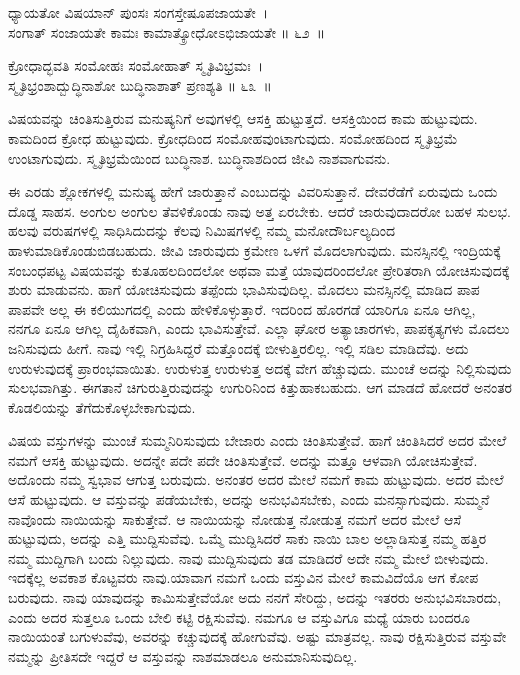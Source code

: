\begin{shloka}
ಧ್ಯಾಯತೋ ವಿಷಯಾನ್ ಪುಂಸಃ ಸಂಗಸ್ತೇಷೂಪಜಾಯತೇ~।\\ಸಂಗಾತ್ ಸಂಜಾಯತೇ ಕಾಮಃ ಕಾಮಾತ್\hfill\break ಕ್ರೋಧೋಽಭಿಜಾಯತೇ \hfill॥ ೬೨~॥
\end{shloka}

\begin{shloka}
ಕ್ರೋಧಾದ್ಭವತಿ ಸಂಮೋಹಃ ಸಂಮೋಹಾತ್ ಸ್ಮೃತಿವಿಭ್ರಮಃ~।\\ಸ್ಮೃತಿಭ್ರಂಶಾದ್ಬುದ್ಧಿನಾಶೋ ಬುದ್ಧಿನಾಶಾತ್ ಪ್ರಣಶ್ಯತಿ \hfill॥ ೬೩~॥
\end{shloka}

\begin{artha}
ವಿಷಯವನ್ನು ಚಿಂತಿಸುತ್ತಿರುವ ಮನುಷ್ಯನಿಗೆ ಅವುಗಳಲ್ಲಿ ಆಸಕ್ತಿ ಹುಟ್ಟುತ್ತದೆ. ಆಸಕ್ತಿಯಿಂದ ಕಾಮ ಹುಟ್ಟುವುದು. ಕಾಮದಿಂದ ಕ್ರೋಧ ಹುಟ್ಟುವುದು. ಕ್ರೋಧದಿಂದ ಸಂಮೋಹವುಂಟಾಗುವುದು. ಸಂಮೋಹದಿಂದ ಸ್ಮೃತಿಭ್ರಮೆ ಉಂಟಾಗುವುದು. ಸ್ಮೃತಿಭ್ರಮೆಯಿಂದ ಬುದ್ಧಿನಾಶ. ಬುದ್ಧಿನಾಶದಿಂದ ಜೀವಿ ನಾಶವಾಗುವನು.
\end{artha}

ಈ ಎರಡು ಶ್ಲೋಕಗಳಲ್ಲಿ ಮನುಷ್ಯ ಹೇಗೆ ಜಾರುತ್ತಾನೆ ಎಂಬುದನ್ನು ವಿವರಿಸುತ್ತಾನೆ. ದೇವರೆಡೆಗೆ ಏರುವುದು ಒಂದು ದೊಡ್ಡ ಸಾಹಸ. ಅಂಗುಲ ಅಂಗುಲ ತೆವಳಿಕೊಂಡು ನಾವು ಅತ್ತ ಏರಬೇಕು. ಆದರೆ ಜಾರುವುದಾದರೋ ಬಹಳ ಸುಲಭ. ಹಲವು ವರುಷಗಳಲ್ಲಿ ಸಾಧಿಸಿದುದನ್ನು ಕೆಲವು ನಿಮಿಷಗಳಲ್ಲಿ ನಮ್ಮ ಮನೋದೌರ್ಬಲ್ಯದಿಂದ ಹಾಳುಮಾಡಿಕೊಂಡುಬಿಡಬಹುದು. ಜೀವಿ ಜಾರುವುದು ಕ್ರಮೇಣ ಒಳಗೆ ಮೊದಲಾಗುವುದು. ಮನಸ್ಸಿನಲ್ಲಿ ಇಂದ್ರಿಯಕ್ಕೆ ಸಂಬಂಧಪಟ್ಟ ವಿಷಯವನ್ನು ಕುತೂಹಲದಿಂದಲೋ ಅಥವಾ ಮತ್ತೆ ಯಾವುದರಿಂದಲೋ ಪ್ರೇರಿತರಾಗಿ ಯೋಚಿ\-ಸುವುದಕ್ಕೆ ಶುರು ಮಾಡುವನು. ಹಾಗೆ ಯೋಚಿಸುವುದು ತಪ್ಪೆಂದು ಭಾವಿಸುವುದಿಲ್ಲ. ಮೊದಲು ಮನಸ್ಸಿನಲ್ಲಿ ಮಾಡಿದ ಪಾಪ ಪಾಪವೇ ಅಲ್ಲ ಈ ಕಲಿಯುಗದಲ್ಲಿ ಎಂದು ಹೇಳಿಕೊಳ್ಳುತ್ತಾರೆ. ಇದರಿಂದ ಹೊರಗಡೆ ಯಾರಿಗೂ ಏನೂ ಆಗಿಲ್ಲ, ನನಗೂ ಏನೂ ಆಗಿಲ್ಲ ದೈಹಿಕವಾಗಿ, ಎಂದು ಭಾವಿಸುತ್ತೇವೆ. ಎಲ್ಲಾ ಘೋರ ಅತ್ಯಾಚಾರಗಳು, ಪಾಪಕೃತ್ಯಗಳು ಮೊದಲು ಜನಿಸುವುದು ಹೀಗೆ. ನಾವು ಇಲ್ಲಿ ನಿಗ್ರಹಿಸಿದ್ದರೆ ಮತ್ತೊಂದಕ್ಕೆ ಬೀಳುತ್ತಿರಲಿಲ್ಲ. ಇಲ್ಲಿ ಸಡಿಲ ಮಾಡಿದೆವು. ಅದು ಉರುಳುವುದಕ್ಕೆ ಪ್ರಾರಂಭವಾಯಿತು. ಉರುಳುತ್ತ ಉರುಳುತ್ತ ಅದಕ್ಕೆ ವೇಗ ಹೆಚ್ಚುವುದು. ಮುಂಚೆ ಅದನ್ನು ನಿಲ್ಲಿಸುವುದು ಸುಲಭವಾಗಿತ್ತು. ಈಗತಾನೆ ಚಿಗುರುತ್ತಿರುವುದನ್ನು ಉಗುರಿನಿಂದ ಕಿತ್ತುಹಾಕಬಹುದು. ಆಗ ಮಾಡದೆ ಹೋದರೆ ಅನಂತರ ಕೊಡಲಿಯನ್ನು ತೆಗೆದುಕೊಳ್ಳಬೇಕಾಗುವುದು.

ವಿಷಯ ವಸ್ತುಗಳನ್ನು ಮುಂಚೆ ಸುಮ್ಮನಿರಿಸುವುದು ಬೇಜಾರು ಎಂದು ಚಿಂತಿಸುತ್ತೇವೆ. ಹಾಗೆ ಚಿಂತಿಸಿದರೆ ಅದರ ಮೇಲೆ ನಮಗೆ ಆಸಕ್ತಿ ಹುಟ್ಟುವುದು. ಅದನ್ನೇ ಪದೇ ಪದೇ ಚಿಂತಿಸುತ್ತೇವೆ. ಅದನ್ನು ಮತ್ತೂ ಆಳವಾಗಿ ಯೋಚಿಸುತ್ತೇವೆ. ಅದೊಂದು ನಮ್ಮ ಸ್ವಭಾವ ಆಗುತ್ತ ಬರುವುದು. ಅನಂತರ ಅದರ ಮೇಲೆ ನಮಗೆ ಕಾಮ ಹುಟ್ಟುವುದು. ಅದರ ಮೇಲೆ ಆಸೆ ಹುಟ್ಟುವುದು. ಆ ವಸ್ತುವನ್ನು ಪಡೆಯಬೇಕು, ಅದನ್ನು ಅನುಭವಿಸಬೇಕು, ಎಂದು ಮನಸ್ಸಾಗುವುದು. ಸುಮ್ಮನೆ ನಾವೊಂದು ನಾಯಿಯನ್ನು ಸಾಕುತ್ತೇವೆ. ಆ ನಾಯಿಯನ್ನು ನೋಡುತ್ತ ನೋಡುತ್ತ ನಮಗೆ ಅದರ ಮೇಲೆ ಆಸೆ ಹುಟ್ಟುವುದು, ಅದನ್ನು ಎತ್ತಿ ಮುದ್ದಿಸುವೆವು. ಒಮ್ಮೆ ಮುದ್ದಿಸಿದರೆ ಸಾಕು ನಾಯಿ ಬಾಲ ಅಲ್ಲಾಡಿಸುತ್ತ ನಮ್ಮ ಹತ್ತಿರ ನಮ್ಮ ಮುದ್ದಿಗಾಗಿ ಬಂದು ನಿಲ್ಲುವುದು. ನಾವು ಮುದ್ದಿ\-ಸುವುದು ತಡ ಮಾಡಿದರೆ ಅದೇ ನಮ್ಮ ಮೇಲೆ ಬೀಳುವುದು. ಇದಕ್ಕೆಲ್ಲ ಅವಕಾಶ ಕೊಟ್ಟವರು ನಾವು.\break ಯಾವಾಗ ನಮಗೆ ಒಂದು ವಸ್ತುವಿನ ಮೇಲೆ ಕಾಮವಿದೆಯೊ ಆಗ ಕೋಪ ಬರುವುದು. ನಾವು ಯಾವುದನ್ನು ಕಾಮಿಸುತ್ತೇವೆಯೋ ಅದು ನನಗೆ ಸೇರಿದ್ದು, ಅದನ್ನು ಇತರರು ಅನುಭವಿಸಬಾರದು, ಎಂದು ಅದರ ಸುತ್ತಲೂ ಒಂದು ಬೇಲಿ ಕಟ್ಟಿ ರಕ್ಷಿಸುವೆವು. ನಮಗೂ ಆ ವಸ್ತುವಿಗೂ ಮಧ್ಯೆ ಯಾರು ಬಂದರೂ ನಾಯಿಯಂತೆ ಬಗುಳುವೆವು, ಅವರನ್ನು ಕಚ್ಚುವುದಕ್ಕೆ ಹೋಗುವೆವು. ಅಷ್ಟು ಮಾತ್ರವಲ್ಲ. ನಾವು ರಕ್ಷಿಸುತ್ತಿರುವ ವಸ್ತುವೇ ನಮ್ಮನ್ನು ಪ್ರೀತಿಸದೇ ಇದ್ದರೆ ಆ ವಸ್ತುವನ್ನು ನಾಶಮಾಡಲೂ ಅನುಮಾನಿಸುವುದಿಲ್ಲ.

